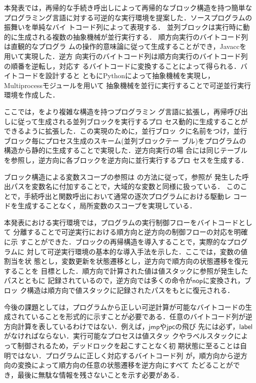 \documentclass[submit,PRO]{ipsj}
\newcommand{\bcode}[1]{$\mathsf{#1}$}
\begin{document}
本発表では，再帰的な手続き呼出しによって再帰的なブロック構造を持つ簡単な
プログラミング言語に対する可逆的な実行環境を提案した．ソースプログラムの
振舞いを単純なバイ
トコード列によって表現する．
並列ブロックは実行時に動的に生成される複数の抽象機械が並行実行する．
順方向実行のバイトコード列は直観的なプログラ
ムの操作的意味論に従って生成することができ，Javaccを用いて実現した．逆方
向実行のバイトコード列は順方向実行のバイトコード列の順番を逆転し，対応す
るバイトコードに変換することによって得られる．バイトコードを設計すると
ともにPythonによって抽象機械を実現し，Multiprocessモジュールを用いて
抽象機械を並行に実行することで可逆並行実行環境を作成した．

ここでは，\cite{DBLP:conf/rc/IkedaY20}をより複雑な構造を持つプログラミン
グ言語に拡張し，再帰呼び出しに従って生成される並列ブロックを実行するプロ
セス動的に生成することができるように拡張した．この実現のために，並行ブロッ
クに名前をつけ，並行ブロック毎にプロセス生成のスキーム(並列ブロックテー
ブル)をプログラムの構造から静的に生成することで実現した．逆方向実行の場
合には同じテーブルを参照し，逆方向に各ブロックを逆方向に並行実行するプロ
セスを生成する．

ブロック構造による変数スコープの参照は
\cite{DBLP:journals/corr/abs-1808-08651,Hoey20PHD}の方法に従って，参照が
発生した呼出パスを変数名に付加することで，大域的な変数と同様に扱っている．
このことで，手続呼出と関数呼出において通常の逐次プログラムにおける駆動レ
コードを生成することなく，局所変数のスコープを実現している．

本発表における実行環境では，プログラムの実行制御フローをバイトコードとして
分離することで可逆実行における順方向と逆方向の制御フローの対応を明確に示
すことができた．ブロックの再帰構造を導入することで，実際的なプログラムに
対して可逆実行環境の基本的な導入手法を示した．ここでは，変数の値割当を状
態とし，変数更新を状態遷移とし，逆方向で順方向の状態遷移を復元することを
目標とした．順方向で計算された値は値スタックに参照が発生したパスとともに
記録されているので，逆方向では多くの命令が\bcode{nop}に変換され，ブロッ
ク構造は順方向で値スタックに記録されたパスをもとに復元される．

今後の課題としては，プログラムから正しい可逆計算が可能なバイトコードの生
成されていることを形式的に示すことが必要である．任意のバイトコード列が逆
方向計算を表しているわけではない．例えば，\bcode{jmp}や\bcode{jpc}の飛び
先には必ず，\bcode{label}がなければならない．実行可能なプロセスは値スタッ
クやラベルスタックによって制御されるため，デッドロックを起こすことなく初
期状態に至ることは自明ではない．プログラムに正しく対応するバイトコード列
が，順方向から逆方向の変換によって順方向の任意の状態遷移を逆方向にすべて
たどることができ，最後に無駄な情報を残さないことを示す必要がある．
\end{document}
